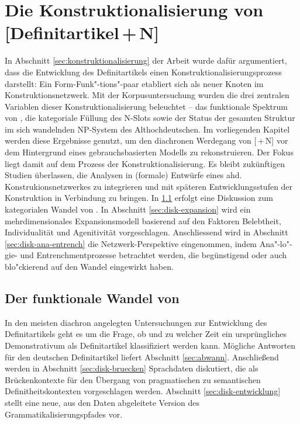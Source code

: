 \chapter{Die Konstruktionalisierung von [Definitartikel\,+\,N]} \label{bicpic}

In Abschnitt \ref{sec:konstruktionalisierung} der Arbeit wurde dafür argumentiert, dass die Entwicklung des Definitartikels einen Konstruktionalisierungsprozess darstellt: Ein Form-Funk"-tions"-paar etabliert sich als neuer Knoten im Konstruktionsnetzwerk. Mit der Korpusuntersuchung wurden die drei zentralen Variablen dieser Konstruktionalisierung beleuchtet -- das funktionale Spektrum von , die kategoriale Füllung des N-Slots sowie der Status der gesamten Struktur im sich wandelnden NP-System des Althochdeutschen. Im vorliegenden Kapitel werden diese Ergebnisse genutzt, um den diachronen Werdegang von [\,+\,N] vor dem Hintergrund eines gebrauchsbasierten Modells zu rekonstruieren. 
Der Fokus liegt damit auf dem Prozess der Konstruktionalisierung. Es bleibt zukünftigen Studien überlassen, die Analysen in (formale) Entwürfe eines ahd. Konstrukionsnetzwerkes zu integrieren und  mit späteren Entwicklungsstufen der Konstruktion in Verbindung zu bringen. 
In \ref{diskussion:der} erfolgt eine Diskussion zum kategorialen Wandel von .  In Abschnitt \ref{sec:disk-expansion} wird ein mehrdimensionales Expansionsmodell basierend auf den Faktoren Belebtheit,  Individualität und Agenitivität vorgeschlagen. Anschlies\-send wird in Abschnitt \ref{sec:disk-ana-entrench} die Netzwerk-Perspektive eingenommen, indem Ana"-lo"-gie- und Entrenchmentprozesse betrachtet werden, die begünstigend oder auch blo"ckierend auf den Wandel eingewirkt haben. 

\section{Der funktionale Wandel von } \label{diskussion:der}

In den meisten diachron angelegten Untersuchungen zur Entwicklung des Definitartikels geht es um die Frage, ob und zu welcher Zeit ein ursprüngliches Demonstrativum als Definitartikel klassifiziert werden kann. Mögliche Antworten für den deutschen Definitartikel liefert Abschnitt \ref{sec:abwann}. Anschließend werden in Abschnitt \ref{sec:disk-bruecken} Sprachdaten diskutiert, die  als Brückenkontexte für den Übergang von pragmatischen zu semantischen Definitheitskontexten vorgeschlagen werden. Abschnitt \ref{sec:disk-entwicklung} stellt eine neue, aus den Daten abgeleitete Version des Grammatikalisierungspfades vor. 


